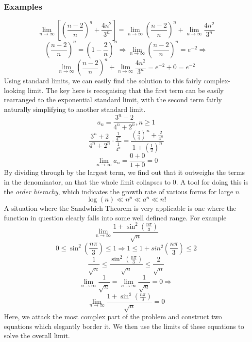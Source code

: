 \documentclass[12pt]{report}
\newcommand{\limit}{\lim\limits}
\begin{document}
\begin{flushleft}
\subsubsection*{Examples}
\[\limit_{n\rightarrow\infty}\left[\left(\frac{n - 2}{n}\right)^n 
+ \frac{4n^2}{3^n}\right] = 
\limit_{n\rightarrow\infty} \left(\frac{n - 2}{n}\right)^n + 
\limit_{n\rightarrow\infty} \frac{4n^2}{3^n}\]
\[\left(\frac{n - 2}{n}\right)^n = \left(1 - \frac{2}{n}\right)^n \Rightarrow
\limit_{n\rightarrow\infty} \left(\frac{n - 2}{n}\right)^n = e^{-2} 
\Rightarrow\]
\[\limit_{n\rightarrow\infty} \left(\frac{n - 2}{n}\right)^n + 
\limit_{n\rightarrow\infty} \frac{4n^2}{3^n} = e^{-2} + 0 = e^{-2}\]
Using standard limits, we can easily find the solution to this fairly 
complex-looking limit. The key here is recognising that the first term can
be easily rearranged to the exponential standard limit, with the second term
fairly naturally simplifying to another standard limit.
\[a_n = \frac{3^n + 2}{4^n + 2^n}, n \geq 1\]
\[\frac{3^n + 2}{4^n + 2^n}\cdot\frac{\frac{1}{4^n}}{\frac{1}{4^n}} = 
\frac{\left(\frac{3}{4}\right)^n + \frac{2}{4^n}}{1 +
\left(\frac{1}{2}\right)^n}\]
\[\limit_{n\rightarrow\infty} a_n = \frac{0 + 0}{1 + 0} = 0\]
By dividing through by the largest term, we find out that it outweighs the 
terms in the denominator, an that the whole limit collapses to \(0\). A tool
for doing this is the \textit{order hierachy}, which indicates the growth rate
of various forms for large \(n\)
\[\log(n) \ll n^p \ll a^n \ll n!\]
A situation where the Sandwhich Theorem is very applicable is one where the 
function in question clearly falls into some well defined range. For example
\[\limit_{n\rightarrow\infty}\frac{1 + \sin^2\left(\frac{n\pi}{3}\right)}{
\sqrt{n}}\]
\[0 \leq \sin^2\left(\frac{n\pi}{3}\right) \leq 1 \Rightarrow 1 \leq 1 + 
sin^2\left(\frac{n\pi}{3}\right) \leq 2\]
\[\frac{1}{\sqrt{n}} \leq \frac{\sin^2\left(\frac{n\pi}{3}\right)}{\sqrt{n}} 
\leq \frac{2}{\sqrt{n}}\]
\[\limit_{n\rightarrow\infty}\frac{1}{\sqrt{n}} 
= \limit_{n\rightarrow\infty}\frac{1}{\sqrt{n}} = 0 \Rightarrow\]
\[\limit_{n\rightarrow\infty}\frac{1 + \sin^2\left(\frac{n\pi}{3}\right)}{
\sqrt{n}} = 0\]
Here, we attack the most complex part of the problem and construct two 
equations which elegantly border it. We then use the limits of these equations
to solve the overall limit.


\end{flushleft}
\end{document}
